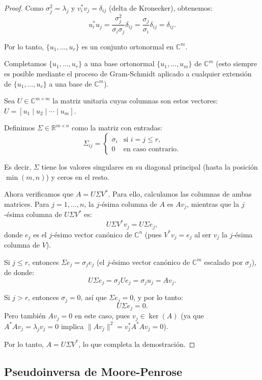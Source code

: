 \documentclass[a4paper,11pt]{report}
\begin{document}
\begin{proof}
Como $\sigma_j^2 = \lambda_j$ y $v_i^* v_j = \delta_{ij}$ (delta de Kronecker), obtenemos:
\[
u_i^* u_j = \frac{\sigma_j^2}{\sigma_i \sigma_j} \delta_{ij} = \frac{\sigma_j}{\sigma_i} \delta_{ij} = \delta_{ij}.
\]

Por lo tanto, $\{u_1, \ldots, u_r\}$ es un conjunto ortonormal en $\mathbb{C}^m$.

Completamos $\{u_1, \ldots, u_r\}$ a una base ortonormal $\{u_1, \ldots, u_m\}$ de $\mathbb{C}^m$ (esto siempre es posible mediante el proceso de Gram-Schmidt aplicado a cualquier extensión de $\{u_1, \ldots, u_r\}$ a una base de $\mathbb{C}^m$).

Sea $U \in \mathbb{C}^{m \times m}$ la matriz unitaria cuyas columnas son estos vectores: $U = [u_1 \mid u_2 \mid \cdots \mid u_m]$.

Definimos $\Sigma \in \mathbb{R}^{m \times n}$ como la matriz con entradas:
\[
\Sigma_{ij} = \begin{cases}
\sigma_i & \text{si } i = j \leq r, \\
0 & \text{en caso contrario}.
\end{cases}
\]

Es decir, $\Sigma$ tiene los valores singulares en su diagonal principal (hasta la posición $\min(m,n)$) y ceros en el resto.

Ahora verificamos que $A = U \Sigma V^*$. Para ello, calculamos las columnas de ambas matrices. Para $j = 1, \ldots, n$, la $j$-ésima columna de $A$ es $Av_j$, mientras que la $j$-ésima columna de $U\Sigma V^*$ es:
\[
U \Sigma V^* v_j = U \Sigma e_j,
\]
donde $e_j$ es el $j$-ésimo vector canónico de $\mathbb{C}^n$ (pues $V^*v_j = e_j$ al ser $v_j$ la $j$-ésima columna de $V$).

Si $j \leq r$, entonces $\Sigma e_j = \sigma_j e_j$ (el $j$-ésimo vector canónico de $\mathbb{C}^m$ escalado por $\sigma_j$), de donde:
\[
U \Sigma e_j = \sigma_j U e_j = \sigma_j u_j = A v_j.
\]

Si $j > r$, entonces $\sigma_j = 0$, así que $\Sigma e_j = 0$, y por lo tanto:
\[
U \Sigma e_j = 0.
\]
Pero también $Av_j = 0$ en este caso, pues $v_j \in \ker(A)$ (ya que $A^*Av_j = \lambda_j v_j = 0$ implica $\|Av_j\|^2 = v_j^*A^*Av_j = 0$).

Por lo tanto, $A = U\Sigma V^*$, lo que completa la demostración.
\end{proof}

\subsection{Pseudoinversa de Moore-Penrose}
\end{document}
